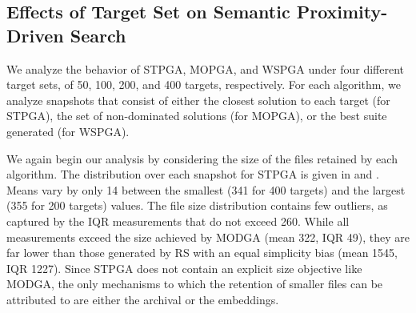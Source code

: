 \begin{center}
\end{center}

\subsection{\label{subsec:targets_effect}Effects of Target Set on Semantic Proximity-Driven Search}

We analyze the behavior of \gls{STPGA}, \gls{MOPGA}, and \gls{WSPGA}
under four different target sets, of 50, 100, 200, and 400 targets, respectively.
For each algorithm, we analyze snapshots that consist of either
the closest solution to each target (for \gls{STPGA}),
the set of non-dominated solutions (for \gls{MOPGA}),
or the best suite generated (for \gls{WSPGA}).

We again begin our analysis by considering the size of the files
retained by each algorithm.
The distribution over each snapshot for \gls{STPGA} is given in
 and .
Means vary by only 14 between the smallest (341 for 400 targets)
and the largest (355 for 200 targets) values.
The file size distribution contains few outliers,
as captured by the \gls{IQR} measurements that do not exceed 260.
While all measurements exceed the size achieved
by \gls{MODGA} (mean 322, \gls{IQR} 49), they are far lower than those
generated by \gls{RS} with an equal simplicity bias (mean 1545, \gls{IQR} 1227).
Since \gls{STPGA} does not contain an explicit size objective like \gls{MODGA},
the only mechanisms to which the retention of smaller files can be attributed to
are either the archival or the embeddings.


